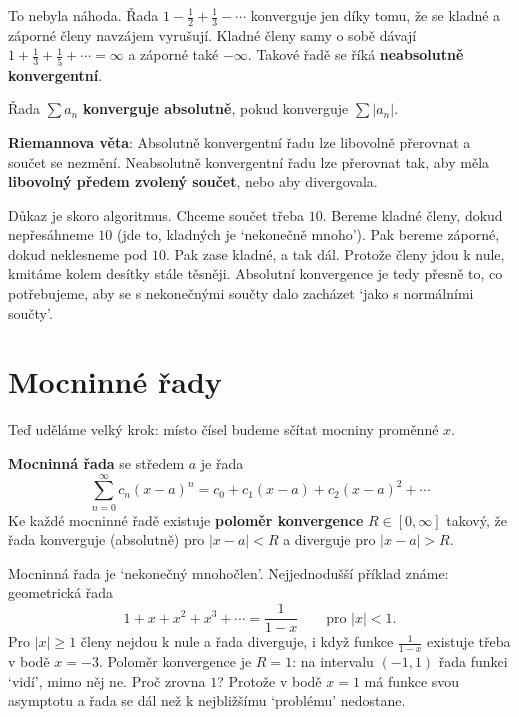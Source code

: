 To nebyla náhoda. Řada $1 - \frac{1}{2} + \frac{1}{3} - \cdots$ konverguje jen díky tomu, že se kladné a záporné členy navzájem vyrušují. Kladné členy samy o sobě dávají $1 + \frac{1}{3} + \frac{1}{5} + \cdots = \infty$ a záporné také $-\infty$. Takové řadě se říká \textbf{neabsolutně konvergentní}.

\begin{definitionbox}
  Řada $\sum a_n$ \textbf{konverguje absolutně}, pokud konverguje $\sum|a_n|$.

  \vspace{0.2cm}

  \textbf{Riemannova věta}: Absolutně konvergentní řadu lze libovolně přerovnat a součet se nezmění. Neabsolutně konvergentní řadu lze přerovnat tak, aby měla \textbf{libovolný předem zvolený součet}, nebo aby divergovala.
\end{definitionbox}

Důkaz je skoro algoritmus. Chceme součet třeba $10$. Bereme kladné členy, dokud nepřesáhneme $10$ (jde to, kladných je `nekonečně mnoho'). Pak bereme záporné, dokud neklesneme pod $10$. Pak zase kladné, a tak dál. Protože členy jdou k nule, kmitáme kolem desítky stále těsněji. Absolutní konvergence je tedy přesně to, co potřebujeme, aby se s nekonečnými součty dalo zacházet `jako s normálními součty'.

\section{Mocninné řady}

Teď uděláme velký krok: místo čísel budeme sčítat mocniny proměnné $x$.

\begin{definitionbox}
  \textbf{Mocninná řada} se středem $a$ je řada
  \begin{equation*}
    \sum_{n=0}^{\infty}c_n{(x - a)}^n = c_0 + c_1(x - a) + c_2{(x - a)}^2 + \cdots
  \end{equation*}
  Ke každé mocninné řadě existuje \textbf{poloměr konvergence} $R\in[0, \infty]$ takový, že řada konverguje (absolutně) pro $|x - a| < R$ a diverguje pro $|x - a| > R$.
\end{definitionbox}

Mocninná řada je `nekonečný mnohočlen'. Nejjednodušší příklad známe: geometrická řada
\begin{equation*}
  1 + x + x^2 + x^3 + \cdots = \frac{1}{1 - x}\qquad\text{pro } |x| < 1.
\end{equation*}
Pro $|x|\geq 1$ členy nejdou k nule a řada diverguje, i když funkce $\frac{1}{1 - x}$ existuje třeba v bodě $x = -3$. Poloměr konvergence je $R = 1$: na intervalu $(-1, 1)$ řada funkci `vidí', mimo něj ne. Proč zrovna $1$? Protože v bodě $x = 1$ má funkce svou asymptotu a řada se dál než k nejbližšímu `problému' nedostane.

